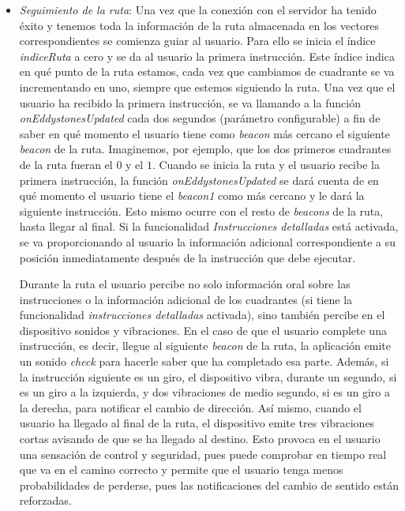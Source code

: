 \begin{itemize}
	\item \textit{Seguimiento de la ruta}: Una vez que la conexión con el servidor ha tenido éxito y tenemos toda la información de la ruta almacenada en los vectores correspondientes se comienza guiar al usuario. Para ello se inicia el índice \textit{indiceRuta} a cero y se da al usuario la primera instrucción. Este índice indica en qué punto de la ruta estamos, cada vez que cambiamos de cuadrante se va incrementando en uno, siempre que estemos siguiendo la ruta. Una vez que el usuario ha recibido la primera instrucción, se va llamando a la función \textit{onEddystonesUpdated} cada dos segundos (parámetro configurable) a fin de saber en qué momento el usuario tiene como \textit{beacon} más cercano el siguiente \textit{beacon} de la ruta. Imaginemos, por ejemplo, que los dos primeros cuadrantes de la ruta fueran el $0$ y el $1$. Cuando se inicia la ruta y el usuario recibe la primera instrucción, la función \textit{onEddystonesUpdated} se dará cuenta de en qué momento el usuario tiene el \textit{beacon1} como más cercano y le dará la siguiente instrucción. Esto mismo ocurre con el resto de \textit{beacons} de la ruta, hasta llegar al final. Si la funcionalidad \textit{Instrucciones detalladas} está activada, se va proporcionando al usuario la información adicional correspondiente a su posición inmediatamente después de la instrucción que debe ejecutar.
	
	Durante la ruta el usuario percibe no solo información oral sobre las instrucciones o la información adicional de los cuadrantes (si tiene la funcionalidad \textit{instrucciones detalladas} activada), sino también percibe en el dispositivo sonidos y vibraciones. En el caso de que el usuario complete una instrucción, es decir, llegue al siguiente \textit{beacon} de la ruta, la aplicación emite un sonido \textit{check} para hacerle saber que ha completado esa parte. Además, si la instrucción siguiente es un giro, el dispositivo vibra, durante un segundo, si es un giro a la izquierda, y dos vibraciones de medio segundo, si es un giro a la derecha, para notificar el cambio de dirección. Así mismo, cuando el usuario ha llegado al final de la ruta, el dispositivo emite tres vibraciones cortas avisando de que se ha llegado al destino. Esto provoca en el usuario una sensación de control y seguridad, pues puede comprobar en tiempo real que va en el camino correcto y permite que el usuario tenga menos probabilidades de perderse, pues las notificaciones del cambio de sentido están reforzadas.
	

\end{itemize}
